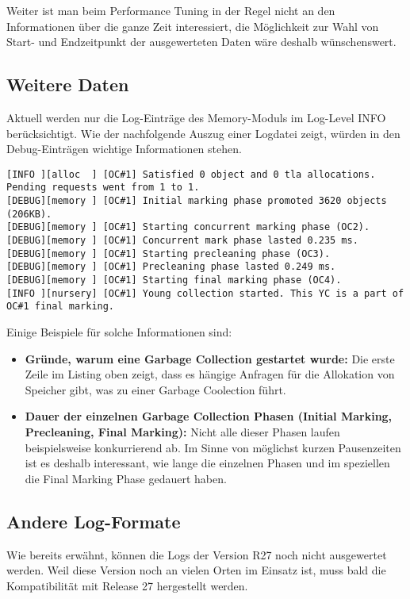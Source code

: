 Weiter ist man beim Performance Tuning in der Regel nicht an den Informationen über die ganze Zeit interessiert, die Möglichkeit zur Wahl von Start- und Endzeitpunkt der ausgewerteten Daten wäre deshalb wünschenswert.

\subsection{Weitere Daten}
Aktuell werden nur die Log-Einträge des Memory-Moduls im Log-Level INFO berücksichtigt. Wie der nachfolgende Auszug einer Logdatei zeigt, würden in den Debug-Einträgen wichtige Informationen stehen.

\begin{lstlisting}[caption=Garbage Collection Log (Debug Informationen)]
[INFO ][alloc  ] [OC#1] Satisfied 0 object and 0 tla allocations. Pending requests went from 1 to 1.
[DEBUG][memory ] [OC#1] Initial marking phase promoted 3620 objects (206KB).
[DEBUG][memory ] [OC#1] Starting concurrent marking phase (OC2).
[DEBUG][memory ] [OC#1] Concurrent mark phase lasted 0.235 ms.
[DEBUG][memory ] [OC#1] Starting precleaning phase (OC3).
[DEBUG][memory ] [OC#1] Precleaning phase lasted 0.249 ms.
[DEBUG][memory ] [OC#1] Starting final marking phase (OC4).
[INFO ][nursery] [OC#1] Young collection started. This YC is a part of OC#1 final marking.
\end{lstlisting}

Einige Beispiele für solche Informationen sind:
\begin{itemize}
	\item \textbf{Gründe, warum eine Garbage Collection gestartet wurde:  }Die erste Zeile im Listing oben zeigt, dass es hängige Anfragen für die Allokation von Speicher gibt, was zu einer Garbage Coolection führt.
	\item \textbf{Dauer der einzelnen Garbage Collection Phasen (Initial Marking, Precleaning, Final Marking): } Nicht alle dieser Phasen laufen beispielsweise konkurrierend ab. Im Sinne von möglichst kurzen Pausenzeiten ist es deshalb interessant, wie lange die einzelnen Phasen und im speziellen die Final Marking Phase gedauert haben. 
\end{itemize}

\subsection{Andere Log-Formate}
Wie bereits erwähnt, können die Logs der Version R27 noch nicht ausgewertet werden. Weil diese Version noch an vielen Orten im Einsatz ist, muss bald die Kompatibilität mit Release 27 hergestellt werden.

